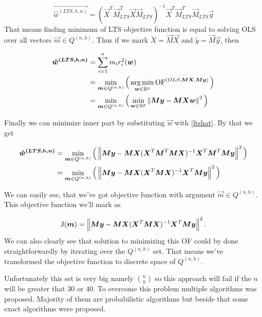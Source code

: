 \begin{equation} 
    \vec{\hat{w}^{(LTS, h, n)}} = (\vec{X}^T\vec{M}^T_{LTS}\vec{X}\vec{M}_{LTS})^{-1}\vec{X}^T\vec{M}^T_{LTS}\vec{M}_{LTS}\vec{y}
\end{equation}
That means finding minimum of LTS objective function is equal to solving OLS over all vectors 
$\vec{m} \in Q^{(n,h)}$. Thus if we mark $\tilde{X} = \vec{M}\vec{X} $ and $\tilde{y} = \vec{M}\vec{y} $, then

\begin{align*} 
    \boldsymbol{\hat{w}^{(LTS, h, n)}}
     &=  \sum\limits_{i=1}^n 
     m_i r_{i}^2(\boldsymbol{w})\\
    &= \operatorname*{min}_{\boldsymbol{m} \in Q^{(n,h)}} 
    \Big( \operatorname*{arg\,min}_{\boldsymbol{w} \in\mathbb{R}^p} 
    \operatorname{OF}^{(OLS,\boldsymbol{M}\boldsymbol{X},  \boldsymbol{M}\boldsymbol{y} )} \Big)\\
    &= \operatorname*{min}_{\boldsymbol{m} \in Q^{(n,h)}} 
    \Big(\operatorname*{min}_{\boldsymbol{w} \in\mathbb{R}^p}  \left\lVert \boldsymbol{M}\boldsymbol{y} -   \boldsymbol{M}\boldsymbol{X}\boldsymbol{w}  \right\rVert^2 \Big)
\end{align*}

Finally we can minimize inner part by substituting $\vec{w}$ with \ref{ltshat}. By that we get

\begin{align*}
    \boldsymbol{\hat{w}^{(LTS, h, n)}}
    &=  \operatorname*{min}_{\boldsymbol{m} \in Q^{(n,h)}} 
    \Big( \left\lVert \boldsymbol{M}\boldsymbol{y} -  \boldsymbol{M}\boldsymbol{X}(\boldsymbol{X}^T\boldsymbol{M}^T\boldsymbol{M}\boldsymbol{X})^{-1}\boldsymbol{X}^T\boldsymbol{M}^T\boldsymbol{M}\boldsymbol{y}  \right\rVert^2 \Big)\\
    &= \operatorname*{min}_{\boldsymbol{m} \in Q^{(n,h)}} 
    \Big( \left\lVert \boldsymbol{M}\boldsymbol{y} -  \boldsymbol{M}\boldsymbol{X}(\boldsymbol{X}^T\boldsymbol{M}\boldsymbol{X})^{-1}\boldsymbol{X}^T\boldsymbol{M}\boldsymbol{y}  \right\rVert^2 \Big)
\end{align*}

We can easily see, that we've got objective function with argument $\vec{m} \in Q^{(n,h)}$. This objective function we'll mark as 

\begin{equation} \label{oflts_discrete}
    \operatorname{J}(\boldsymbol{m}) =  \left\lVert \boldsymbol{M}\boldsymbol{y} -  \boldsymbol{M}\boldsymbol{X}(\boldsymbol{X}^T\boldsymbol{M}\boldsymbol{X})^{-1}\boldsymbol{X}^T\boldsymbol{M}\boldsymbol{y}  \right\rVert^2.
\end{equation}
We can also clearly see that solution to minimizing this OF could by done straightforwardly by iterating over the $Q^{(n,h)}$ set. That means we've transformed the objective function to discrete space of $Q^{(n,h)}$.

Unfortunately this set is very big namely $\binom{n}{h}$ so this approach will fail if the $n$ will be greater that $30$ or $40$. To overcome this problem multiple algorithms was proposed. Majority of them are probabilistic algorithms but beside that some exact algorithms were proposed. 

